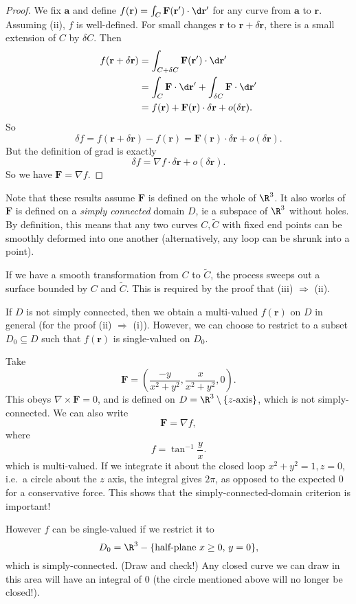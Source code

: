 \documentclass[a4paper]{article}
\begin{document}
\begin{proof}
  We fix $\mathbf{a}$ and define $f(\mathbf{r}) = \int_C \mathbf{F}(\mathbf{r}')\cdot\d \mathbf{r}'$ for any curve from $\mathbf{a}$ to $\mathbf{r}$. Assuming (ii), $f$ is well-defined. For small changes $\mathbf{r}$ to $\mathbf{r} + \delta \mathbf{r}$, there is a small extension of $C$ by $\delta C$. Then
  \begin{align*}
    f(\mathbf{r} + \delta \mathbf{r}) &= \int_{C + \delta C}\mathbf{F} (\mathbf{r}')\cdot \d \mathbf{r}'\\
    &= \int_C \mathbf{F}\cdot \d \mathbf{r}' + \int_{\delta C}\mathbf{F}\cdot \d \mathbf{r}'\\
    &= f(\mathbf{r}) + \mathbf{F}(\mathbf{r})\cdot \delta \mathbf{r} + o(\delta \mathbf{r}).
  \end{align*}
  So
  \[
    \delta f = f(\mathbf{r} + \delta \mathbf{r}) - f(\mathbf{r}) = \mathbf{F}(\mathbf{r})\cdot \delta \mathbf{r} + o(\delta \mathbf{r}).
  \]
  But the definition of grad is exactly
  \[
    \delta f = \nabla f\cdot \delta \mathbf{r} + o(\delta \mathbf{r}).
  \]
  So we have $\mathbf{F} = \nabla f$.
\end{proof}
Note that these results assume $\mathbf{F}$ is defined on the whole of $\R^3$. It also works of $\mathbf{F}$ is defined on a \emph{simply connected} domain $D$, ie a subspace of $\R^3$ without holes. By definition, this means that any two curves $C, \tilde{C}$ with fixed end points can be smoothly deformed into one another (alternatively, any loop can be shrunk into a point).

If we have a smooth transformation from $C$ to $\tilde{C}$, the process sweeps out a surface bounded by $C$ and $\tilde{C}$. This is required by the proof that (iii) $\Rightarrow$ (ii).

If $D$ is not simply connected, then we obtain a multi-valued $f(\mathbf{r})$ on $D$ in general (for the proof (ii) $\Rightarrow$ (i)). However, we can choose to restrict to a subset $D_0\subseteq D$ such that $f(\mathbf{r})$ is single-valued on $D_0$.

\begin{eg}
  Take
  \[
    \mathbf{F} = \left(\frac{- y}{x^2 + y^2}, \frac{x}{x^2 + y^2}, 0\right).
  \]
  This obeys $\nabla\times \mathbf{F} = 0$, and is defined on $D = \R^3 \setminus \{z\text{-axis}\}$, which is not simply-connected. We can also write
  \[
    \mathbf{F} = \nabla f,
  \]
  where
  \[
    f = \tan^{-1}\frac{y}{x}.
  \]
  which is multi-valued. If we integrate it about the closed loop $x^2 + y^2 = 1, z = 0$, i.e.\ a circle about the $z$ axis, the integral gives $2\pi$, as opposed to the expected $0$ for a conservative force. This shows that the simply-connected-domain criterion is important!

  However $f$ can be single-valued if we restrict it to
  \[
    D_0 = \R^3 - \{\text{half-plane }x \geq 0,\, y = 0\},
  \]
  which is simply-connected. (Draw and check!) Any closed curve we can draw in this area will have an integral of $0$ (the circle mentioned above will no longer be closed!).
\end{eg}
\end{document}
